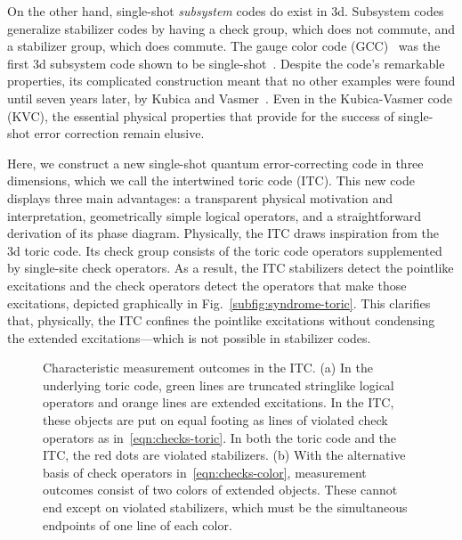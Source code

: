 On the other hand, single-shot \emph{subsystem} codes do exist in 3d.
Subsystem codes generalize stabilizer codes by having a check group, which does not commute, and a stabilizer group, which does commute.
The gauge color code (GCC)~\cite{Bombin2015Gauge} was the first 3d subsystem code shown to be single-shot~\cite{Bombin2015SingleShot}. Despite the code's remarkable properties, its complicated construction meant that no other examples were found until seven years later, by Kubica and Vasmer~\cite{KubicaVasmer2022}. Even in the Kubica-Vasmer code (KVC), the essential physical properties that provide for the success of single-shot error correction remain elusive. 

Here, we construct a new single-shot quantum error-correcting code in three dimensions, which we call the intertwined toric code (ITC). This new code displays three main advantages: a transparent physical motivation and interpretation, geometrically simple logical operators, and a straightforward derivation of its phase diagram.
Physically, the ITC draws inspiration from the 3d toric code. Its check group consists of the toric code operators supplemented by single-site check operators. As a result, the ITC stabilizers detect the pointlike excitations and the check operators detect the operators that make those excitations, depicted graphically in Fig.~\ref{subfig:syndrome-toric}. This clarifies that, physically, the ITC confines the pointlike excitations without condensing the extended excitations---which is not possible in stabilizer codes. 

\begin{figure}[t]
    \centering
    \qquad
    \caption[Characteristic measurement outcomes in the ITC]{Characteristic measurement outcomes in the ITC. (a) In the underlying toric code, green lines are truncated stringlike logical operators and orange lines are extended excitations. In the ITC, these objects are put on equal footing as lines of violated check operators as in~\eqref{eqn:checks-toric}. In both the toric code and the ITC, the red dots are violated stabilizers. (b) With the alternative basis of check operators in~\eqref{eqn:checks-color}, measurement outcomes consist of two colors of extended objects. These cannot end except on violated stabilizers, which must be the simultaneous endpoints of one line of each color.}
    \label{fig:syndrome}
\end{figure}

